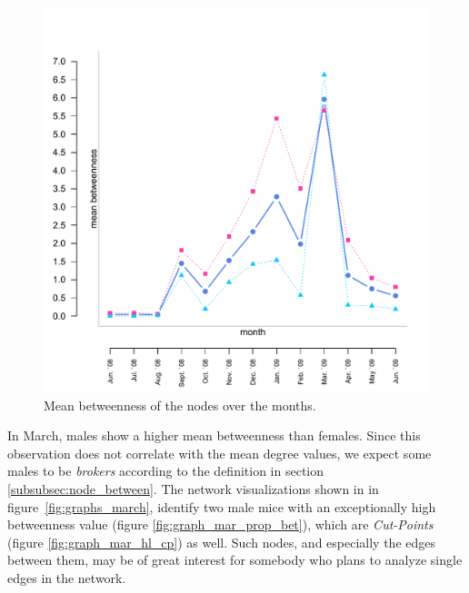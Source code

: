 \begin{figure}[htpb]
\begin{center}
  \includegraphics[width=.6\textwidth]{assets/pdf/long_betweenness.pdf}
  \caption[Mean betweenness of the nodes over the months]{Mean betweenness of the nodes over the months.}
  \label{fig:long_betweenness}
\end{center}
\end{figure}

In March, males show a higher mean betweenness than females. Since this observation does not correlate with the mean degree values, we expect some males to be \textit{brokers} according to the definition in section \ref{subsubsec:node_between}. The network visualizations shown in in figure~\ref{fig:graphs_march}, identify two male mice with an exceptionally high betweenness value (figure \ref{fig:graph_mar_prop_bet}), which are  \textit{Cut-Points} (figure \ref{fig:graph_mar_hl_cp}) as well. Such nodes, and especially the edges between them, may be of great interest for somebody who plans to analyze single edges in the network.   

